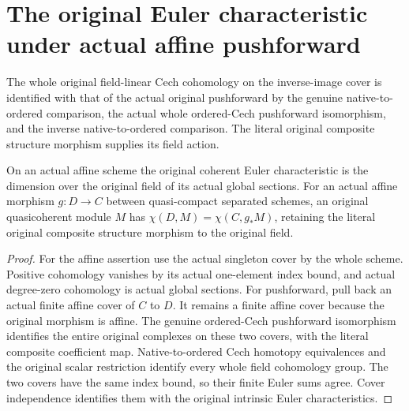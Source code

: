 \section{The original Euler characteristic under actual affine pushforward}

\begin{definition}
\label{def:fc-scheme-coherent-euler-pushforward-comparison}
\leanok
{}
The whole original field-linear Cech cohomology on the inverse-image
cover is identified with that of the actual original pushforward by
the genuine native-to-ordered comparison, the actual whole ordered-Cech
pushforward isomorphism, and the inverse native-to-ordered comparison.
The literal original composite structure morphism supplies its field action.
\end{definition}

\begin{theorem}
\label{thm:fc-scheme-coherent-euler-affine}
\leanok
{}
On an actual affine scheme the original coherent Euler characteristic
is the dimension over the original field of its actual global sections.
For an actual affine morphism $g:D\to C$ between quasi-compact separated
schemes, an original quasicoherent module $M$ has
$\chi(D,M)=\chi(C,g_*M)$, retaining the literal original composite
structure morphism to the original field.
\end{theorem}
\begin{proof}
For the affine assertion use the actual singleton cover by the whole
scheme. Positive cohomology vanishes by its actual one-element index
bound, and actual degree-zero cohomology is actual global sections.
For pushforward, pull back an actual finite affine cover of $C$ to $D$.
It remains a finite affine cover because the original morphism is affine.
The genuine ordered-Cech pushforward isomorphism identifies the entire
original complexes on these two covers, with the literal composite
coefficient map. Native-to-ordered Cech homotopy equivalences and the
original scalar restriction identify every whole field cohomology group.
The two covers have the same index bound, so their finite Euler sums
agree. Cover independence identifies them with the original intrinsic
Euler characteristics.
\end{proof}
